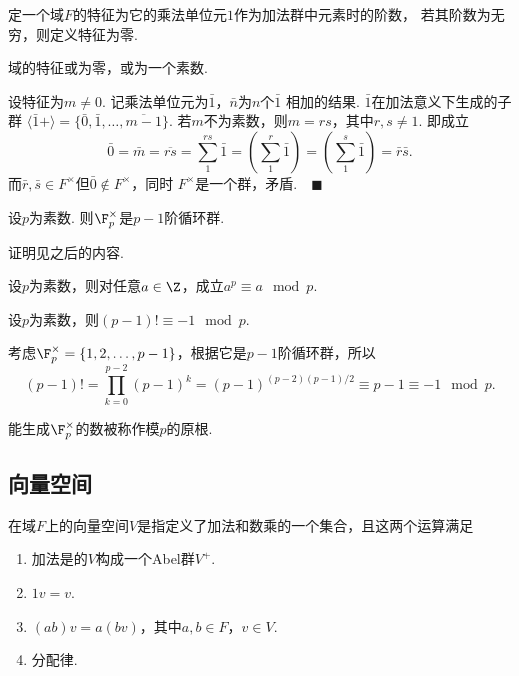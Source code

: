   \begin{defi}
    定一个域$F$的特征为它的乘法单位元$1$作为加法群中元素时的阶数，
    若其阶数为无穷，则定义特征为零.
  \end{defi}

  \begin{lemma}
    域的特征或为零，或为一个素数.
  \end{lemma}
  \proof
    设特征为$m\ne 0$. 记乘法单位元为$\bar{1}$，$\bar{n}$为$n$个$\bar{1}$
    相加的结果. $\bar{1}$在加法意义下生成的子群
    $\langle\bar{1}+\rangle=\{\bar{0},\bar{1},\dots,\overline{m-1}\}$.
    若$m$不为素数，则$m=rs$，其中$r,s\ne 1$. 即成立
    \[
      \bar{0}=\bar{m}=\overline{rs}=\sum_1^{rs}\bar{1}
      =\left(\sum_1^r\bar{1}\right)=\left(\sum_1^s\bar{1}\right)
      =\bar{r}\bar{s}.
    \]
    而$\bar{r},\bar{s}\in F^\times$但$\bar{0} \notin F^\times$，同时
    $F^\times$是一个群，矛盾.$\quad\blacksquare$

  \begin{thm}[乘法群的结构]
    \label{thm: 乘法群的结构}
    设$p$为素数. 则$\F_p^\times$是$p-1$阶循环群.
  \end{thm}
  \remark
    证明见之后的内容.

  \begin{cor}[Fermat]
    设$p$为素数，则对任意$a\in\Z$，成立$a^p\equiv a\mod p$.
  \end{cor}

  \begin{cor}[Wilson]
    设$p$为素数，则$(p-1)!\equiv -1 \mod p$.
  \end{cor}
  \proof
    考虑$\F_p^\times=\{1,2,\dots,p-1\}$，根据它是$p-1$阶循环群，所以
    \[
      (p-1)! = \prod_{k=0}^{p-2}(p-1)^k = (p-1)^{(p-2)(p-1)/2}
      \equiv p-1 \equiv -1 \mod p.
    \]

  \begin{defi}[原根]
    能生成$\F_p^\times$的数被称作模$p$的原根.
  \end{defi}

\subsection{向量空间}

  \begin{defi}[向量空间]
    在域$F$上的向量空间$V$是指定义了加法和数乘的一个集合，且这两个运算满足
    \begin{enumerate}
      \item 加法是的$V$构成一个Abel群$V^+$.
      \item $1v=v$.
      \item $(ab)v=a(bv)$，其中$a,b\in F$，$v\in V$.
      \item 分配律.
    \end{enumerate}
  \end{defi}

